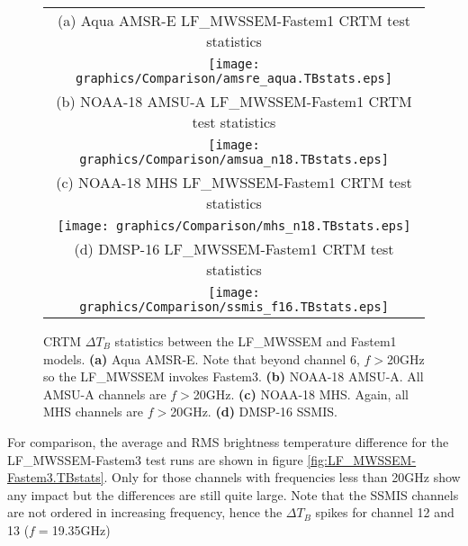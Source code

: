 \begin{figure}[htp]
  \centering
  \begin{tabular}{c}
    \textsf{(a) Aqua AMSR-E LF\_MWSSEM-Fastem1 CRTM test statistics}\\
    \texttt{[image: graphics/Comparison/amsre\_aqua.TBstats.eps]}\\
    \textsf{(b) NOAA-18 AMSU-A LF\_MWSSEM-Fastem1 CRTM test statistics}\\
    \texttt{[image: graphics/Comparison/amsua\_n18.TBstats.eps]}\\
    \textsf{(c) NOAA-18 MHS LF\_MWSSEM-Fastem1 CRTM test statistics}\\
    \texttt{[image: graphics/Comparison/mhs\_n18.TBstats.eps]}\\
    \textsf{(d) DMSP-16 LF\_MWSSEM-Fastem1 CRTM test statistics}\\
    \texttt{[image: graphics/Comparison/ssmis\_f16.TBstats.eps]}
  \end{tabular}
  \caption{CRTM $\Delta T_B$ statistics between the LF\_MWSSEM and Fastem1 models. \textbf{(a)} Aqua AMSR-E. Note that beyond channel 6, $f\!>$20GHz so the LF\_MWSSEM invokes Fastem3. \textbf{(b)} NOAA-18 AMSU-A. All AMSU-A channels are $f\!>$20GHz. \textbf{(c)} NOAA-18 MHS. Again, all MHS channels are $f\!>$20GHz. \textbf{(d)} DMSP-16 SSMIS.}
  \label{fig:LF_MWSSEM-Fastem1.TBstats}
\end{figure}

For comparison, the average and RMS brightness temperature difference for the LF\_MWSSEM-Fastem3 test runs are shown in figure \ref{fig:LF_MWSSEM-Fastem3.TBstats}. Only for those channels with frequencies less than 20GHz show any impact but the differences are still quite large. Note that the SSMIS channels are not ordered in increasing frequency, hence the $\Delta T_B$ spikes for channel 12 and 13 ($f\!=$19.35GHz)

